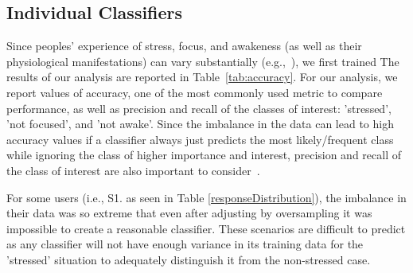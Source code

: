 \subsection{Individual Classifiers}
Since peoples' experience of stress, focus, and awakeness (as well as
their physiological manifestations) can vary substantially
(e.g.,~\cite{Hernandez11}), we first trained  The results of our analysis are reported in
Table~\ref{tab:accuracy}. For our analysis, we report values of
accuracy, one of the most commonly used metric to compare performance,
as well as precision and recall of the classes of interest:
'stressed', 'not focused', and 'not awake'. Since the imbalance in the
data can lead to high accuracy values if a classifier always just
predicts the most likely/frequent class while ignoring the class of
higher importance and interest, precision and recall of the class of
interest are also important to
consider~\cite{yap2014,bhattacharyya_data_2011,Hernandez11}.


For some users (i.e., S1. as seen in Table \ref{responseDistribution}), the imbalance in their data was so extreme that even after adjusting by oversampling it was impossible to create a reasonable classifier. These scenarios are difficult to predict as any classifier will not have enough variance in its training data for the 'stressed' situation to adequately distinguish it from the non-stressed case.




